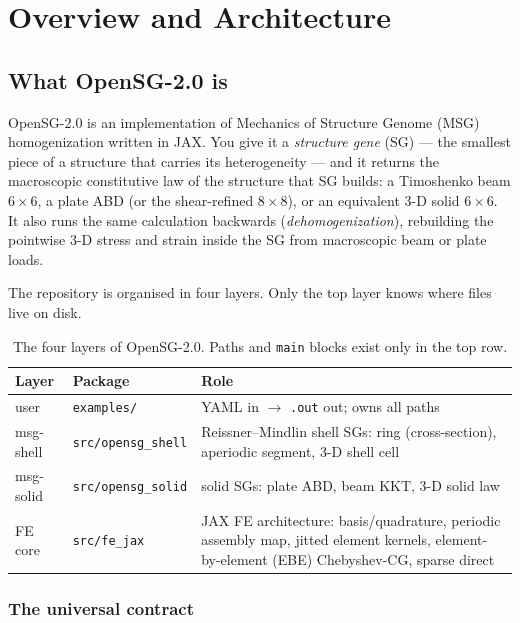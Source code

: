 \chapter{Overview and Architecture}
\label{ch:overview}

\section{What OpenSG-2.0 is}
\label{sec:what-is}

OpenSG-2.0 is an implementation of Mechanics of Structure Genome (MSG)
homogenization written in JAX. You give it a \emph{structure gene} (SG) --- the
smallest piece of a structure that carries its heterogeneity --- and it returns
the macroscopic constitutive law of the structure that SG builds: a Timoshenko
beam $6\times6$, a plate ABD (or the shear-refined $8\times8$), or an equivalent
3-D solid $6\times6$. It also runs the same calculation backwards
(\emph{dehomogenization}), rebuilding the pointwise 3-D stress and strain inside
the SG from macroscopic beam or plate loads.

The repository is organised in four layers. Only the top layer knows where files
live on disk.

\begin{table}[htbp]
\centering
\caption{The four layers of OpenSG-2.0. Paths and \texttt{main} blocks exist
only in the top row.}
\label{tab:layers}
\small
\begin{tabular}{@{}llp{7.4cm}@{}}
\toprule
Layer & Package & Role \\
\midrule
user     & \texttt{examples/}        & YAML in $\rightarrow$ \texttt{.out} out; owns all paths \\
msg-shell& \texttt{src/opensg\_shell}& Reissner--Mindlin shell SGs: ring (cross-section), aperiodic segment, 3-D shell cell \\
msg-solid& \texttt{src/opensg\_solid}& solid SGs: plate ABD, beam KKT, 3-D solid law \\
FE core  & \texttt{src/fe\_jax}      & JAX FE architecture: basis/quadrature, periodic assembly map, jitted element kernels, element-by-element (EBE) Chebyshev-CG, sparse direct \\
\bottomrule
\end{tabular}
\end{table}

\subsection{The universal contract}
\label{sec:contract}

